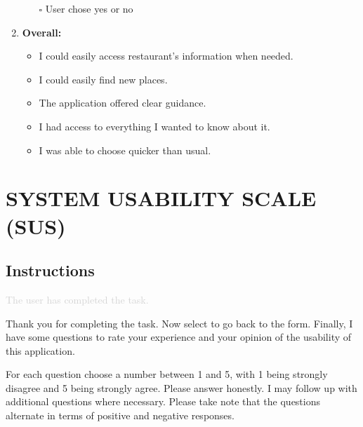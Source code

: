 \documentclass[a4 paper, 10pt]{article}
\begin{document}
\begin{multicols}{2}
\begin{enumerate}
\begin{itemize}
                    \item[$\square$] User chose yes or no
                \end{itemize}

    \item \textbf{Overall:}
        \begin{itemize}
            \item I could easily access restaurant’s information when needed.
            \item I could easily find new places.
            \item The application offered clear guidance.
            \item I had access to everything I wanted to know about it.
            \item I was able to choose quicker than usual.
        \end{itemize}
    \end{enumerate}
\end{multicols}

\section*{SYSTEM USABILITY SCALE (SUS)}
    \subsection*{Instructions}
        \textcolor{lightgray}{The user has completed the task.}

        \begin{itshape}
            Thank you for completing the task. Now select to go back to the form. Finally, I have some questions to rate your experience and your opinion of the usability of this application. 

            For each question choose a number between 1 and 5, with 1 being strongly disagree and 5 being strongly agree. Please answer honestly. I may follow up with additional questions where necessary. Please take note that the questions alternate in terms of positive and negative responses. 
        \end{itshape}
\end{document}
